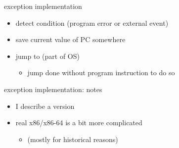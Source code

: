\begin{frame}{exception implementation}
\begin{itemize}
\item detect condition (program error or external event)
\item save current value of PC somewhere
\item jump to  (part of OS)
    \begin{itemize}
    \item jump done without program instruction to do so
    \end{itemize}
\end{itemize}
\end{frame}

\begin{frame}{exception implementation: notes}
\begin{itemize}
\item I describe a  version
\item real x86/x86-64 is a bit more complicated
    \begin{itemize}
    \item (mostly for historical reasons)
    \end{itemize}
\end{itemize}
\end{frame}

